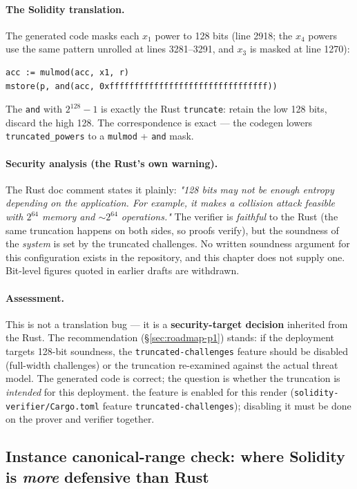 \paragraph{The Solidity translation.} The generated code masks each
$x_1$ power to 128 bits (line 2918; the $x_4$ powers use the same
pattern unrolled at lines 3281--3291, and $x_3$ is masked at line 1270):
\begin{lstlisting}[style=yul]
acc := mulmod(acc, x1, r)
mstore(p, and(acc, 0xffffffffffffffffffffffffffffffff))
\end{lstlisting}
The \texttt{and} with $2^{128}{-}1$ is exactly the Rust
\texttt{truncate}: retain the low 128 bits, discard the high 128.
The correspondence is exact --- the codegen lowers
\texttt{truncated\_powers} to a \texttt{mulmod} + \texttt{and}
mask.

\paragraph{Security analysis (the Rust's own warning).} The Rust doc
comment states it plainly: \emph{"128 bits may not be enough entropy
depending on the application. For example, it makes a collision
attack feasible with $2^{64}$ memory and $\sim 2^{64}$ operations."}
The verifier is \emph{faithful} to the Rust (the same truncation
happens on both sides, so proofs verify), but the soundness of the
\emph{system} is set by the truncated challenges. No written soundness
argument for this configuration exists in the repository, and this
chapter does not supply one.  Bit-level figures quoted
in earlier drafts are withdrawn.

\paragraph{Assessment.} This is not a translation bug --- it is a
\textbf{security-target decision} inherited from the Rust. The
recommendation (\S\ref{sec:roadmap-p1}) stands: if the deployment
targets 128-bit soundness, the \texttt{truncated-challenges} feature
should be disabled (full-width challenges) or the truncation
re-examined against the actual threat model. The generated code is
correct; the question is whether the truncation is \emph{intended}
for this deployment.  the feature is enabled for this
render (\texttt{solidity-verifier/\allowbreak{}Cargo.toml} feature
\texttt{truncated-challenges}); disabling it must be done on the prover
and verifier together.

\subsection{Instance canonical-range check: where Solidity is \emph{more} defensive than Rust}
\label{sec:pr-instance-range}


